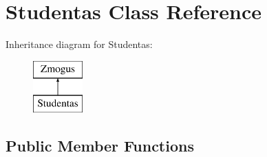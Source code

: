 \hypertarget{class_studentas}{}\section{Studentas Class Reference}
\label{class_studentas}
Inheritance diagram for Studentas\+:\begin{figure}[H]
\begin{center}
\leavevmode
\includegraphics[height=2.000000cm]{class_studentas}
\end{center}
\end{figure}
\subsection*{Public Member Functions}
